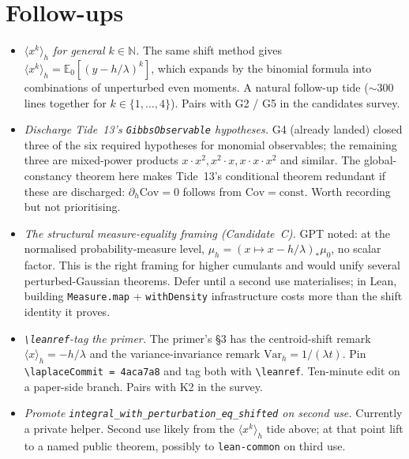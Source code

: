 \documentclass[11pt]{article}
\begin{document}
\section{Follow-ups}

\begin{itemize}
\item \emph{$\langle x^k \rangle_h$ for general $k \in \mathbb{N}$.}
  The same shift method gives
  $\langle x^k \rangle_h = \mathbb{E}_0[(y - h/\lambda)^k]$, which
  expands by the binomial formula into combinations of unperturbed
  even moments. A natural follow-up tide ($\sim$300 lines together
  for $k \in \{1,\ldots,4\}$). Pairs with G2 / G5 in the candidates
  survey.

\item \emph{Discharge Tide~13's \texttt{GibbsObservable} hypotheses.}
  G4 (already landed) closed three of the six required hypotheses for
  monomial observables; the remaining three are mixed-power products
  $x \cdot x^2, x^2 \cdot x, x \cdot x \cdot x^2$ and similar. The
  global-constancy theorem here makes Tide~13's conditional theorem
  redundant if these are discharged: $\partial_h \mathrm{Cov} = 0$
  follows from $\mathrm{Cov} = \text{const}$. Worth recording but not
  prioritising.

\item \emph{The structural measure-equality framing (Candidate~C).}
  GPT noted: at the normalised probability-measure level,
  $\mu_h = (x \mapsto x - h/\lambda)_* \mu_0$, no scalar factor. This
  is the right framing for higher cumulants and would unify several
  perturbed-Gaussian theorems. Defer until a second use materialises;
  in Lean, building \texttt{Measure.map} + \texttt{withDensity}
  infrastructure costs more than the shift identity it proves.

\item \emph{\texttt{\textbackslash leanref}-tag the primer.} The
  primer's §3 has the centroid-shift remark
  $\langle x \rangle_h = -h/\lambda$ and the variance-invariance
  remark $\mathrm{Var}_h = 1/(\lambda t)$. Pin
  \texttt{\textbackslash laplaceCommit = 4aca7a8} and tag both with
  \texttt{\textbackslash leanref}. Ten-minute edit on a paper-side
  branch. Pairs with K2 in the survey.

\item \emph{Promote \texttt{integral\_with\_perturbation\_eq\_shifted}
  on second use.} Currently a private helper. Second use likely from
  the $\langle x^k \rangle_h$ tide above; at that point lift to a
  named public theorem, possibly to \texttt{lean-common} on third use.
\end{itemize}
\end{document}
